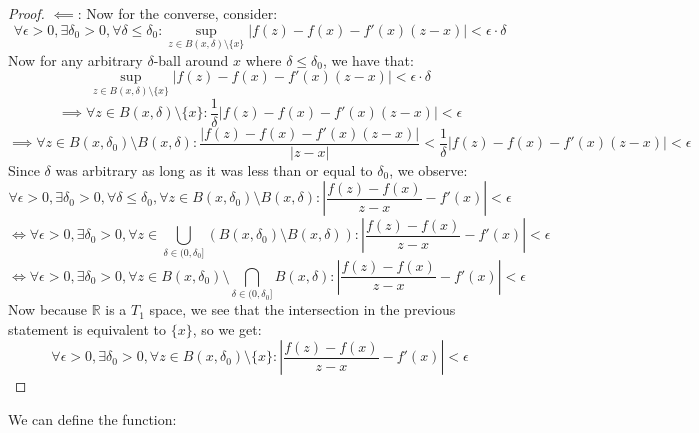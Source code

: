 \documentclass[10pt,letterpaper]{article} %
\begin{document}
\begin{proof}
$\impliedby$: Now for the converse, consider:
\begin{equation*}
\forall \epsilon >0, \exists \delta_0 > 0, \forall \delta \leqslant \delta_0: \sup_{z \in B(x, \delta)\setminus\{x\}}|f(z) - f(x) - f'(x)(z-x)| < \epsilon \cdot \delta
\end{equation*}
Now for any arbitrary $\delta$-ball around $x$ where $\delta \leqslant \delta_0$, we have that:
\begin{equation*}
\sup_{z \in B(x, \delta)\setminus \{x\}}|f(z) - f(x) - f'(x)(z-x)| < \epsilon \cdot \delta
\end{equation*}
\begin{equation*}
\implies \forall z \in B(x, \delta) \setminus \{x\}: \frac{1}{\delta}|f(z) - f(x) - f'(x)(z-x)| < \epsilon
\end{equation*}
\begin{equation*}
\implies \forall z \in B(x, \delta_0) \setminus B(x, \delta): \frac{|f(z) - f(x) - f'(x)(z-x)|}{|z-x|} < \frac{1}{\delta}|f(z) - f(x) - f'(x)(z-x)| < \epsilon
\end{equation*}
Since $\delta$ was arbitrary as long as it was less than or equal to $\delta_0$, we observe:
\begin{equation*}
\forall \epsilon > 0, \exists \delta_0 > 0, \forall \delta \leqslant \delta_0, \forall z \in B(x, \delta_0)\setminus B(x, \delta): \left|\frac{f(z) - f(x)}{z-x} - f'(x)\right| < \epsilon
\end{equation*}
\begin{equation*}
\iff \forall \epsilon > 0, \exists \delta_0 > 0, \forall z \in \bigcup_{\delta \in (0, \delta_0]}(B(x, \delta_0)\setminus B(x, \delta)): \left|\frac{f(z) - f(x)}{z-x} - f'(x)\right| < \epsilon
\end{equation*}
\begin{equation*}
\iff \forall \epsilon > 0, \exists \delta_0 > 0, \forall z \in B(x, \delta_0) \setminus \bigcap_{\delta \in (0, \delta_0]}B(x, \delta): \left|\frac{f(z) - f(x)}{z-x} - f'(x)\right| < \epsilon
\end{equation*}
Now because $\mathbb{R}$ is a $T_1$ space, we see that the intersection in the previous statement is equivalent to $\{x\}$, so we get:
\begin{equation*}
\forall \epsilon > 0, \exists \delta_0 > 0, \forall z \in B(x, \delta_0) \setminus \{x\}: \left|\frac{f(z) - f(x)}{z-x} - f'(x)\right| < \epsilon
\end{equation*}
\end{proof}
We can define the function:
\end{document}
